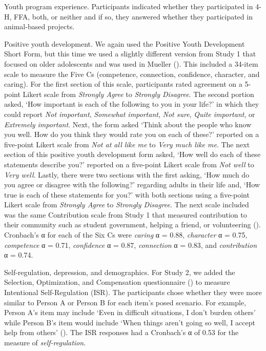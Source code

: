 \documentclass[
  jou,
  longtable,
  nolmodern,
  notxfonts,
  notimes,
  colorlinks=true,linkcolor=blue,citecolor=blue,urlcolor=blue]{apa7}
\begin{document}
{Youth program experience.} Participants indicated whether they
participated in 4-H, FFA, both, or neither and if so, they answered
whether they participated in animal-based projects.

{Positive youth development.} We again used the Positive Youth
Development Short Form, but this time we used a slightly different
version from Study 1 that focused on older adolescents and was used in
Mueller (). This included a 34-item
scale to measure the Five Cs (competence, connection, confidence,
character, and caring). For the first section of this scale,
participants rated agreement on a 5-point Likert scale from
\emph{Strongly Agree} to \emph{Strongly Disagree}. The second portion
asked, `How important is each of the following to you in your life?' in
which they could report \emph{Not important}, \emph{Somewhat important},
\emph{Not sure}, \emph{Quite important}, or \emph{Extremely important}.
Next, the form asked `Think about the people who know you well. How do
you think they would rate you on each of these?' reported on a
five-point Likert scale from \emph{Not at all like me} to \emph{Very
much like me}. The next section of this positive youth development form
asked, `How well do each of these statements describe you?' reported on
a five-point Likert scale from \emph{Not well} to \emph{Very well}.
Lastly, there were two sections with the first asking, `How much do you
agree or disagree with the following?' regarding adults in their life
and, `How true is each of these statements for you?' with both sections
using a five-point Likert scale from \emph{Strongly Agree} to
\emph{Strongly Disagree}. The next scale included was the same
Contribution scale from Study 1 that measured contribution to their
community such as student government, helping a friend, or volunteering
(). Cronbach's α for each of
the Six Cs were \emph{caring} α = 0.88, \emph{character} α = 0.75,
\emph{competence} α = 0.71, \emph{confidence} α = 0.87,
\emph{connection} α = 0.83, and \emph{contribution} α = 0.74.

{Self-regulation, depression, and demographics.} For Study 2, we added
the Selection, Optimization, and Compensation questionnaire
() to measure
Intentional Self-Regulation (ISR). The participants chose whether they
were more similar to Person A or Person B for each item's posed
scenario. For example, Person A's item may include `Even in difficult
situations, I don't burden others' while Person B's item would include
`When things aren't going so well, I accept help from others'
(). The ISR
responses had a Cronbach's α of 0.53 for the measure of
\emph{self-regulation}.
\end{document}
